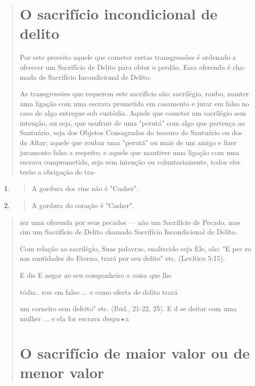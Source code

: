 \begin{quote}
\section{O sacrifício incondicional de delito}

Por este preceito aquele que cometer certas transgressões é ordena­do a
oferecer um Sacrifício de Delito para obter o perdão. Essa oferenda é
cha­mada de Sacrifício Incondicional de Delito.

As transgressões que requerem este sacrifício são: sacrilégio, roubo,
manter uma ligação com uma escrava prometida em casamento e jurar em
falso no caso de algo entregue sob custódia. Aquele que cometer um
sacrilégio sem intenção, ou seja, que usufruir de uma "perutá" com algo
que pertença ao San­tuário, seja dos Objetos Consagrados do tesouro do
Santuário ou dos do Altar; aquele que roubar uma "perutá" ou mais de um
amigo e fizer juramento falso a respeito; e aquele que mantiver uma
ligação com uma escrava comprometi­da, seja sem intenção ou
voluntariamente, todos eles terão a obrigação de tra-
\end{quote}

\begin{enumerate}
\def\labelenumi{\arabic{enumi}.}
\setcounter{enumi}{87}
\item
 \begin{quote}
 A gordura dos rins não é "Casher".
 \end{quote}
\item
 \begin{quote}
 A gordura do coração é "Casher".
 \end{quote}
\end{enumerate}

\begin{quote}zer uma oferenda por seus pecados --- não um Sacrifício de Pecado, mas
sim um Sacrifício de Delito chamado Sacrifício Incondicional de Delito.

Com relação ao sacrilégio, Suas palavras, enaltecido seja Ele, são: "E
pec ro nas santidades do Eterno, trará por seu delito" etc. (Levítico
5:15).

E dis E negar ao seu companheiro a coisa que lhe

tódia.. rou em falso ... e como oferta de delito trará

um carneiro sem defeito" etc. (Ibid., 21-22, 25). E d se deitar com uma
mulher ... e ela for escrava despo•a

\section{O sacrifício de maior valor ou de menor valor}
\end{quote}

